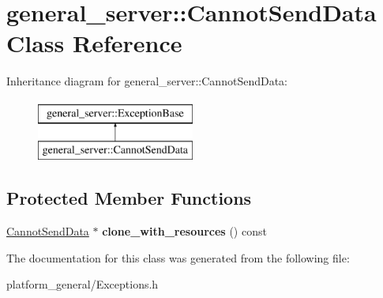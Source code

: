\hypertarget{classgeneral__server_1_1CannotSendData}{\section{general\-\_\-server\-:\-:\-Cannot\-Send\-Data \-Class \-Reference}
\label{classgeneral__server_1_1CannotSendData}
}
\-Inheritance diagram for general\-\_\-server\-:\-:\-Cannot\-Send\-Data\-:\begin{figure}[H]
\begin{center}
\leavevmode
\includegraphics[height=2.000000cm]{classgeneral__server_1_1CannotSendData}
\end{center}
\end{figure}
\subsection*{\-Protected \-Member \-Functions}
\begin{DoxyCompactItemize}
\item 
\hypertarget{classgeneral__server_1_1CannotSendData_a0b9b3ca80145e1ae0ebb4f0c02976d62}{\hyperlink{classgeneral__server_1_1CannotSendData}{\-Cannot\-Send\-Data} $\ast$ {\bfseries clone\-\_\-with\-\_\-resources} () const }\label{classgeneral__server_1_1CannotSendData_a0b9b3ca80145e1ae0ebb4f0c02976d62}

\end{DoxyCompactItemize}


\-The documentation for this class was generated from the following file\-:\begin{DoxyCompactItemize}
\item 
platform\-\_\-general/\-Exceptions.\-h\end{DoxyCompactItemize}
